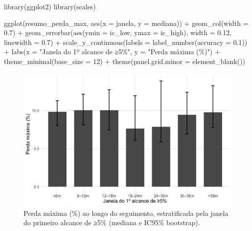 \documentclass[
]{article}
\newenvironment{Shaded}{\begin{snugshade}}{\end{snugshade}}
\newcommand{\AttributeTok}[1]{\textcolor[rgb]{0.40,0.45,0.13}{#1}}
\newcommand{\DecValTok}[1]{\textcolor[rgb]{0.68,0.00,0.00}{#1}}
\newcommand{\FloatTok}[1]{\textcolor[rgb]{0.68,0.00,0.00}{#1}}
\newcommand{\FunctionTok}[1]{\textcolor[rgb]{0.28,0.35,0.67}{#1}}
\newcommand{\NormalTok}[1]{\textcolor[rgb]{0.00,0.23,0.31}{#1}}
\newcommand{\SpecialCharTok}[1]{\textcolor[rgb]{0.37,0.37,0.37}{#1}}
\newcommand{\StringTok}[1]{\textcolor[rgb]{0.13,0.47,0.30}{#1}}
\begin{document}
\begin{Shaded}
\begin{Highlighting}[]
\FunctionTok{library}\NormalTok{(ggplot2)}
\FunctionTok{library}\NormalTok{(scales)}

\FunctionTok{ggplot}\NormalTok{(resumo\_perda\_max, }\FunctionTok{aes}\NormalTok{(}\AttributeTok{x =}\NormalTok{ janela, }\AttributeTok{y =}\NormalTok{ mediana)) }\SpecialCharTok{+}
  \FunctionTok{geom\_col}\NormalTok{(}\AttributeTok{width =} \FloatTok{0.7}\NormalTok{) }\SpecialCharTok{+}
  \FunctionTok{geom\_errorbar}\NormalTok{(}\FunctionTok{aes}\NormalTok{(}\AttributeTok{ymin =}\NormalTok{ ic\_low, }\AttributeTok{ymax =}\NormalTok{ ic\_high), }\AttributeTok{width =} \FloatTok{0.12}\NormalTok{, }\AttributeTok{linewidth =} \FloatTok{0.7}\NormalTok{) }\SpecialCharTok{+}
  \FunctionTok{scale\_y\_continuous}\NormalTok{(}\AttributeTok{labels =} \FunctionTok{label\_number}\NormalTok{(}\AttributeTok{accuracy =} \FloatTok{0.1}\NormalTok{)) }\SpecialCharTok{+}
  \FunctionTok{labs}\NormalTok{(}\AttributeTok{x =} \StringTok{"Janela do 1º alcance de ≥5\%"}\NormalTok{, }\AttributeTok{y =} \StringTok{"Perda máxima (\%)"}\NormalTok{) }\SpecialCharTok{+}
  \FunctionTok{theme\_minimal}\NormalTok{(}\AttributeTok{base\_size =} \DecValTok{12}\NormalTok{) }\SpecialCharTok{+}
  \FunctionTok{theme}\NormalTok{(}\AttributeTok{panel.grid.minor =} \FunctionTok{element\_blank}\NormalTok{())}
\end{Highlighting}
\end{Shaded}

\begin{figure}[H]

{\centering \includegraphics[width=1\textwidth,height=\textheight]{outputs/figs/grafico-perda-maxima-por-janela-7-1.png}

}

\caption{Perda máxima (\%) ao longo do seguimento, estratificada pela
janela do primeiro alcance de ≥5\% (mediana e IC95\% bootstrap).}

\end{figure}%
\end{document}
